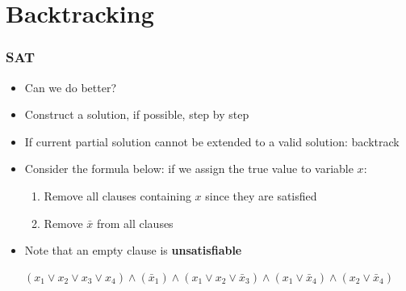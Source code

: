 \documentclass{beamer}
\begin{document}
\section{Backtracking}
\begin{frame}
  \frametitle{SAT}
  \begin{itemize}
    \item Can we do better?
   \item Construct a solution, if possible, step by step
   \item If current partial  solution cannot be extended to a valid solution: backtrack
  \item Consider the formula below: if we assign the true value to variable $x$:
  \begin{enumerate}
    \item Remove all clauses containing $x$ since they are satisfied
    \item Remove $\bar{x}$ from all clauses    
  \end{enumerate}
  \item Note that an empty clause is \textbf{ unsatisfiable}
  \end{itemize}
  \begin{align*}
    (x_1\vee x_2\vee x_3\vee x_4)\wedge(\bar{x}_1)\wedge(x_1\vee x_2\vee\bar{x}_3)\wedge(x_1\vee\bar{x}_4)\wedge(x_2\vee\bar{x}_4)
  \end{align*}
\end{frame}
\end{document}
